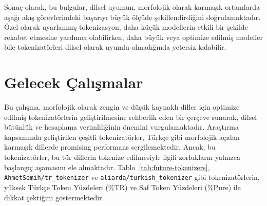 \documentclass{article}
\begin{document}
Sonuç olarak, bu bulgular, dilsel uyumun, morfolojik olarak karmaşık ortamlarda aşağı akış görevlerindeki başarıyı büyük ölçüde şekillendirdiğini doğrulamaktadır. Özel olarak uyarlanmış tokenizasyon, daha küçük modellerin etkili bir şekilde rekabet etmesine yardımcı olabilirken, daha büyük veya optimize edilmiş modeller bile tokenizatörleri dilsel olarak uyumlu olmadığında yetersiz kalabilir.

\section{Gelecek Çalışmalar}

Bu çalışma, morfolojik olarak zengin ve düşük kaynaklı diller için optimize edilmiş tokenizatörlerin geliştirilmesine rehberlik eden bir çerçeve sunarak, dilsel bütünlük ve hesaplama verimliliğinin önemini vurgulamaktadır. Araştırma kapsamında geliştirilen çeşitli tokenizatörler, Türkçe gibi morfolojik açıdan karmaşık dillerde promising performans sergilemektedir. Ancak, bu tokenizatörler, bu tür dillerin tokenize edilmesiyle ilgili zorlukların yalnızca başlangıç aşamasını ele almaktadır. Tablo~\ref{tab:future-tokenizers}, \texttt{AhmetSemih/tr\_tokenizer} ve \texttt{aliarda/turkish\_tokenizer} gibi tokenizatörlerin, yüksek Türkçe Token Yüzdeleri (\%TR) ve Saf Token Yüzdeleri (\%Pure) ile dikkat çektiğini göstermektedir.

\begin{table}[H]
\centering
\caption{Tokenizatörlerin İlk Geliştirme Aşamasındaki Performans Metrikleri}
\label{tab:future-tokenizers}
\end{table}
\end{document}
